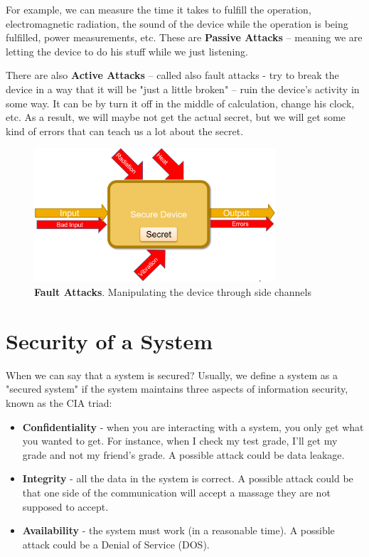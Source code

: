 For example, we can measure the time it takes to fulfill the operation, electromagnetic radiation, the sound of the device while the operation is being fulfilled, power measurements, etc. These are \textbf{Passive Attacks} – meaning we are letting the device to do his stuff while we just listening.

There are also \textbf{Active Attacks} – called also fault attacks -  try to break the device in a way that it will be "just a little broken" – ruin the device's activity in some way. It can be by turn it off in the middle of calculation, change his clock, etc. As a result, we will maybe not get the actual secret, but we will get some kind of errors that can teach us a lot about the secret. 

\begin{figure}[htb]
    \centering
    \includegraphics[width=0.8\textwidth]{images/ch1_Intro/Secure_device3.png}
    \caption{\textbf{Fault Attacks}. Manipulating the device through side channels}
    \label{fig:SecDev3}
\end{figure}

\section{Security of a System}
\label{sec:SystemSecurity}

When we can say that a system is secured?
Usually, we define a system as a "secured system" if the system maintains three aspects of information security, known as the CIA\cite{cia} triad:

\begin{itemize}
\item \textbf{Confidentiality} - when you are interacting with a system, you only get what you wanted to get. For instance, when I check my test grade, I’ll get my grade and not my friend’s grade. A possible attack could be data leakage.
\item \textbf{Integrity} - all the data in the system is correct. A possible attack could be that one side of the communication will accept a massage they are not supposed to accept.
\item \textbf{Availability} - the system must work (in a reasonable time). A possible attack could be a Denial of Service (DOS).
\end{itemize}

